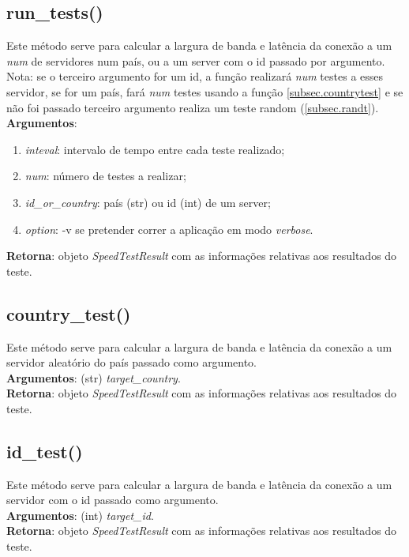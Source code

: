 \documentclass{report}
\begin{document}
\subsection{run\_tests()}
\label{subsec.runt}
Este método serve para calcular a largura de banda e latência da conexão a um \textit{num} de servidores num país, ou a um server com o id passado por argumento.\\
Nota: se o terceiro argumento for um id, a função realizará \textit{num} testes a esses servidor, se for um país, fará \textit{num} testes usando a função \autoref{subsec.countrytest} e se não foi passado terceiro argumento realiza um teste random (\autoref{subsec.randt}).\\
\textbf{Argumentos}: 
\begin{enumerate}
\item \textit{inteval}: intervalo de tempo entre cada teste realizado;
\item \textit{num}: número de testes a realizar;
\item \textit{id\_or\_country}: país (str) ou id (int) de um server;
\item \textit{option}: -v se pretender correr a aplicação em modo \textit{verbose}.
\end{enumerate}
\textbf{Retorna}: objeto \textit{SpeedTestResult} com as informações relativas aos resultados do teste.

\subsection{country\_test()}
\label{subsec.countrytest}
Este método serve para calcular a largura de banda e latência da conexão a um servidor aleatório do país passado como argumento.\\ 
\textbf{Argumentos}: (str) \textit{target\_country}.\\
\textbf{Retorna}: objeto \textit{SpeedTestResult} com as informações relativas aos resultados do teste.

\subsection{id\_test()}
\label{subsec.idtest}
Este método serve para calcular a largura de banda e latência da conexão a um servidor com o id passado como argumento.\\ 
\textbf{Argumentos}: (int) \textit{target\_id}.\\
\textbf{Retorna}: objeto \textit{SpeedTestResult} com as informações relativas aos resultados do teste.
\end{document}
